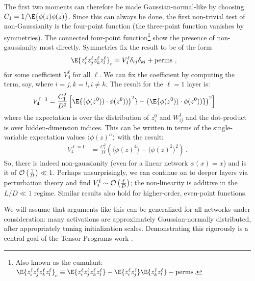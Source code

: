 \documentclass[11pt]{article}
\begin{document}
The first two moments can therefore be made Gaussian-normal-like by choosing $ C _{ 1 } = 1/ \E{ \phi(z)\phi(z )} $.
Since this can always be done, the first non-trivial test of non-Gaussianity is the four-point
function (the three-point function vanishes by symmetries). The connected four-point
function\footnote{Also known as the cumulant: $ \E{ z^{ \ell }_{ i }z^{ \ell }_{ j }z^{ \ell }_{
k }z^{ \ell }_{ l}} _{ c } \equiv \E{ z^{ \ell }_{ i }z^{ \ell }_{ j }z^{ \ell }_{
k }z^{ \ell }_{ l}} - \E{ z^{ \ell }_{ i }z^{ \ell }_{ j }}\E{ z^{ \ell }_{
k }z^{ \ell }_{ l}} - {\rm perms}$. } show
the presence of non-gaussianity most directly. Symmetries fix the result to be of the form
\begin{align}
     \E{ z^{ \ell }_{ i }z^{ \ell }_{ j }z^{ \ell }_{
k }z^{ \ell }_{ l}} _{ c } &= V ^{ \ell } _{ 4 }\delta _{ ij }\delta _{ kl } + {\rm perms} \ ,
\end{align}
for some coefficient $ V ^{ \ell } _{ 4 } $ for all $ \ell $.  We can fix the coefficient by
computing the term, say, where $ i=j, k=l, i\neq k $. The result for the $ \ell=1 $ layer is:
\begin{align}
    V ^{\ell = 1  } _{ 4 } &= \frac{ C _{ 1 } ^{ 2 } }{ D ^{ 2 } } \left [ \E{ \left (  \phi(z ^{ 0 }))\cdot \phi(z ^{ 0 })) \right) ^{ 2 } } - \left ( \E{  \phi(z ^{ 0 }))\cdot \phi(z ^{ 0 }))} \right) ^{ 2 }  \right ]
\end{align}
where the expectation is over the distribution of $ z ^{ 0 }_{ i } $ and $ W ^{ 1 }_{ ij } $ and the
dot-product is over hidden-dimension indices. This can be written in terms of the single-variable
expectation values  $ \langle \phi(z)^{ n }\rangle $ with the result:
\begin{align}
    V ^{\ell = 1  } _{ 4 }   &= \frac{ C _{ 1 } ^{ 2 } }{ D } \left ( \langle \phi(z)^{ 4 }\rangle -
    \langle \phi(z)^{ 2 }\rangle ^{ 2 } \right ) \ .
\end{align}
So, there is indeed non-gaussianity (even for a linear network $ \phi(x)= x $) and is it of $ \mathcal{O}
\left( \frac{ 1 }{ D } \right)  \ll    1$. Perhaps unsurprisingly, we can continue on to deeper
layers via perturbation theory and find $ V ^{ \ell } _{ 4 } \sim \mathcal{O} \left( \frac{ \ell }{ D }
\right)  $; the non-linearity is additive in the $ L /D \ll 1  $ regime. Similar results also hold
for higher-order, even-point functions.

We will assume that arguments like this can be generalized for all networks under consideration:
many activations are approximately Gaussian-normally distributed, after appropriately tuning
initialization scales. Demonstrating this rigorously is a central goal of the Tensor Programs work
\cite{yang2022tensor}.
\end{document}
